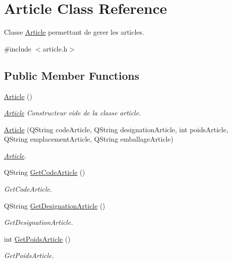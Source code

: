\hypertarget{class_article}{}\section{Article Class Reference}
\label{class_article}


Classe \mbox{\hyperlink{class_article}{Article}} permettant de gerer les articles.  




{\ttfamily \#include $<$article.\+h$>$}

\subsection*{Public Member Functions}
\begin{DoxyCompactItemize}
\item 
\mbox{\hyperlink{class_article_aba1b3142ede0565d468cb4135384c96f}{Article}} ()
\begin{DoxyCompactList}\small\item\em \mbox{\hyperlink{class_article}{Article}} Constructeur vide de la classe article. \end{DoxyCompactList}\item 
\mbox{\hyperlink{class_article_a7422cbd424c70f209ef1bf83ea0fd42e}{Article}} (Q\+String code\+Article, Q\+String designation\+Article, int poids\+Article, Q\+String emplacement\+Article, Q\+String emballage\+Article)
\begin{DoxyCompactList}\small\item\em \mbox{\hyperlink{class_article}{Article}}. \end{DoxyCompactList}\item 
Q\+String \mbox{\hyperlink{class_article_aa7a4dfd88216d2cea5d2393fac2af585}{Get\+Code\+Article}} ()
\begin{DoxyCompactList}\small\item\em Get\+Code\+Article. \end{DoxyCompactList}\item 
Q\+String \mbox{\hyperlink{class_article_af9b0da3a793b4a0dcfe8e97b24ac4f79}{Get\+Designation\+Article}} ()
\begin{DoxyCompactList}\small\item\em Get\+Designation\+Article. \end{DoxyCompactList}\item 
int \mbox{\hyperlink{class_article_a0509109984e6d86e783c457ce70d13a7}{Get\+Poids\+Article}} ()
\begin{DoxyCompactList}\small\item\em Get\+Poids\+Article. \end{DoxyCompactList}\item 

\end{DoxyCompactItemize}
